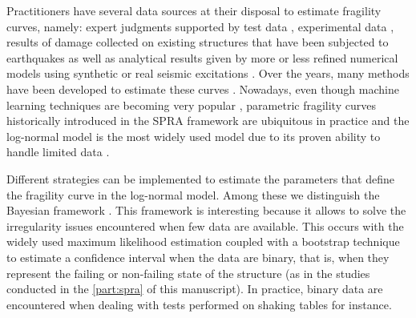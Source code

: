 Practitioners have several data sources at their disposal to estimate fragility curves, namely: expert judgments supported by test data \citep{kennedy_probabilistic_1980,kennedy_seismic_1984,park_survey_1998,zentner_fragility_2017}, experimental data \citep{park_survey_1998,gardoni_probabilistic_2002,choe_closed-form_2007}, results of damage collected on existing structures that have been subjected to earthquakes \citep{shinozuka_statistical_2000,lallemant_statistical_2015,straub_improved_2008} as well as analytical results given by more or less refined numerical models using synthetic or real seismic excitations \citep{zentner_numerical_2010,wang_influence_2020,mandal_seismic_2016,wang_bayesian_2018,wang_seismic_2018,zhao_seismic_2020}. Over the years, many methods have been developed to estimate these curves \citep{shinozuka_statistical_2000,lallemant_statistical_2015,zentner_fragility_2017}. Nowadays, even though machine learning techniques are becoming very popular  \citep{park_rapid_2014,seo_use_2013,gidaris_kriging_2015,wang_seismic_2018,sainct_efficient_2020,gauchy_estimation_2022}, parametric fragility curves historically introduced in the SPRA framework are ubiquitous in practice and the log-normal model is the most widely used model due to its proven ability to handle limited data \citep{shinozuka_statistical_2000,lallemant_statistical_2015,straub_improved_2008,zentner_numerical_2010,wang_influence_2020,mandal_seismic_2016,hariri-ardebili_probabilistic_2016,wang_bayesian_2018,wang_seismic_2018,zhao_seismic_2020,ellingwood_earthquake_2001,kim_development_2004,mai_seismic_2017,trevlopoulos_parametric_2019,katayama_bayesian-estimation-based_2021}.

Different strategies can be implemented to estimate the parameters that define the fragility curve in the log-normal model. Among these we distinguish the Bayesian framework
\citep{gardoni_probabilistic_2002,wang_seismic_2018,katayama_bayesian-estimation-based_2021,koutsourelakis_assessing_2010,damblin_approche_2014,tadinada_structural_2017,kwag_computationally_2018,jeon_parameterized_2019,tabandeh_physics-based_2020,lee_efficient_2023}. 
This framework is interesting because it allows to solve the irregularity issues encountered %
{when few data are available}. This occurs with the widely used maximum likelihood estimation coupled with a bootstrap technique to estimate a confidence interval when the data are binary, that is, when they represent the failing or non-failing state of the structure (as in the studies conducted in the \cref{part:spra} of this manuscript). In practice, binary data are encountered 
when dealing with tests performed on shaking tables for instance.

